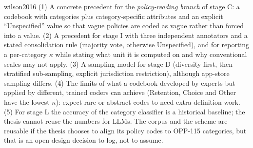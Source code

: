 \begin{papercard}{wilson2016}
 (1) A concrete precedent for the \emph{policy-reading branch} of stage C: a codebook with categories plus category-specific attributes and an explicit ``Unspecified'' value so that vague policies are coded as vague rather than forced into a value. (2) A precedent for stage I with three independent annotators and a stated consolidation rule (majority vote, otherwise Unspecified), and for reporting a per-category $\kappa$ while stating what unit it is computed on and why conventional scales may not apply. (3) A sampling model for stage D (diversity first, then stratified sub-sampling, explicit jurisdiction restriction), although app-store sampling differs. (4) The limits of what a codebook developed by experts but applied by different, trained coders can achieve (Retention, Choice and Other have the lowest $\kappa$): expect rare or abstract codes to need extra definition work. (5) For stage L the accuracy of the category classifier is a historical baseline; the thesis cannot reuse the numbers for LLMs. The corpus and the scheme are reusable if the thesis chooses to align its policy codes to OPP-115 categories, but that is an open design decision to log, not to assume.
\end{papercard}
